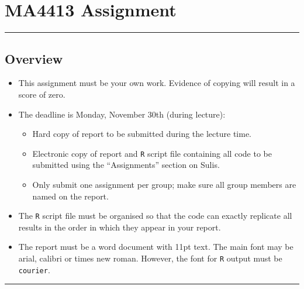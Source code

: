\documentclass[12pt]{article}
\begin{document}
\section*{MA4413 Assignment }
\noindent\rule{\linewidth}{1pt}
\subsection*{Overview}
\begin{itemize}
\item This assignment must be your own work. Evidence of copying will result in a score of zero.
\item The deadline is Monday, November 30th (during lecture):
\begin{itemize}
\item Hard copy of report to be submitted during the lecture time.
\item Electronic copy of report and \texttt{R} script file containing all code to be submitted using the ``Assignments'' section on Sulis.
\item Only submit one assignment per group; make sure all group members are named on the report.
\end{itemize}
\item The \texttt{R} script file must be organised so that the code can exactly replicate all results in the order in which they appear in your report.
\item The report must be a word document with 11pt text. The main font may be arial, calibri or times new roman. However, the font for \texttt{R} output must be \texttt{courier}.
\end{itemize}
\noindent\rule{\linewidth}{1pt}
\end{document}
